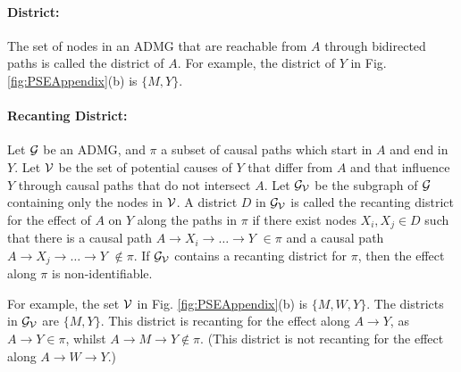 \documentclass{article}
\newcommand{\figref}[1]{Fig. \ref{#1}}
\begin{document}
\paragraph{District:} The set of nodes in an ADMG that are reachable from $A$ through bidirected paths is called the district of $A$. For example, the district of $Y$ in \figref{fig:PSEAppendix}(b) is $\{M,Y\}$.

\paragraph{Recanting District:} Let ${\cal G}$ be an ADMG, and $\pi$ a subset of causal paths which start in $A$ and end in $Y$. 
Let $\cal{V}$ be the set of potential causes of $Y$ that differ from $A$ and that influence $Y$ through causal paths that do not intersect $A$. 
Let ${\cal G}_{{\cal V}}$ be the subgraph of ${\cal G}$ containing only the nodes in $\cal{V}$.
A district $D$ in ${\cal G}_{{\cal V}}$ is called the recanting district for the effect of $A$ on $Y$ along the paths in $\pi$ if there exist nodes $X_i,X_j\in D$ such that there is a causal path $A\rightarrow X_i \rightarrow \ldots \rightarrow Y$ $\in\pi$
and a causal path $A\rightarrow X_j \rightarrow \ldots \rightarrow Y$ $\notin\pi$. If ${\cal G}_{{\cal V}}$ contains a recanting district for $\pi$, then the effect along $\pi$ is non-identifiable.

For example, the set ${\cal V}$ in \figref{fig:PSEAppendix}(b) is $\{M,W,Y\}$. The districts in ${\cal G}_{{\cal V}}$ are $\{M,Y\}$. This district is recanting for the effect along $A\rightarrow Y$, as $A \rightarrow Y \in \pi$, whilst $A \rightarrow M \rightarrow Y \notin \pi$.
(This district is not recanting for the effect along $A\rightarrow W \rightarrow Y$.)
\end{document}
